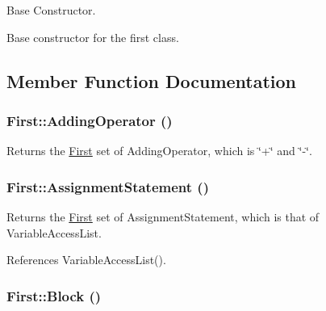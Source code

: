 Base Constructor. 

Base constructor for the first class.

\subsection{Member Function Documentation}
\hypertarget{classFirst_afd4316b16d2f0497aca2e99420d448bb}{
\subsubsection[{AddingOperator}]{ First::AddingOperator ()}}
\label{classFirst_afd4316b16d2f0497aca2e99420d448bb}


Returns the \hyperlink{classFirst}{First} set of AddingOperator, which is \char`\"{}+\char`\"{} and \char`\"{}-\/\char`\"{}. 

\hypertarget{classFirst_a0b4661a1cddafd8b7140c0baf5af8b0a}{
\subsubsection[{AssignmentStatement}]{ First::AssignmentStatement ()}}
\label{classFirst_a0b4661a1cddafd8b7140c0baf5af8b0a}


Returns the \hyperlink{classFirst}{First} set of AssignmentStatement, which is that of VariableAccessList. 



References VariableAccessList().

\hypertarget{classFirst_aedc44f52b44e7b409df77f585d5c0a94}{
\subsubsection[{Block}]{ First::Block ()}}
\label{classFirst_aedc44f52b44e7b409df77f585d5c0a94}


